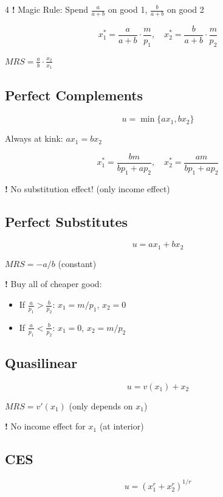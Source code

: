 \documentclass[8pt,landscape]{article}
\newcommand{\tip}[1]{\textcolor{red!70!black}{\textbf{!} #1}}
\begin{document}
\begin{multicols}{4}
\tip{Magic Rule:} Spend $\frac{a}{a+b}$ on good 1, $\frac{b}{a+b}$ on good 2

$$x_1^* = \frac{a}{a+b} \cdot \frac{m}{p_1}, \quad x_2^* = \frac{b}{a+b} \cdot \frac{m}{p_2}$$

$MRS = \frac{a}{b} \cdot \frac{x_2}{x_1}$

\subsection{Perfect Complements}
$$u = \min\{ax_1, bx_2\}$$

Always at kink: $ax_1 = bx_2$

$$x_1^* = \frac{bm}{bp_1 + ap_2}, \quad x_2^* = \frac{am}{bp_1 + ap_2}$$

\tip{No substitution effect!} (only income effect)

\begin{center}
\end{center}

\subsection{Perfect Substitutes}
$$u = ax_1 + bx_2$$

$MRS = -a/b$ (constant)

\tip{Buy all of cheaper good:}
\begin{itemize}
    \item If $\frac{a}{p_1} > \frac{b}{p_2}$: $x_1 = m/p_1$, $x_2 = 0$
    \item If $\frac{a}{p_1} < \frac{b}{p_2}$: $x_1 = 0$, $x_2 = m/p_2$
\end{itemize}

\subsection{Quasilinear}
$$u = v(x_1) + x_2$$

$MRS = v'(x_1)$ (only depends on $x_1$)

\tip{No income effect for $x_1$} (at interior)

\subsection{CES}
$$u = (x_1^r + x_2^r)^{1/r}$$


\end{multicols}
\end{document}
